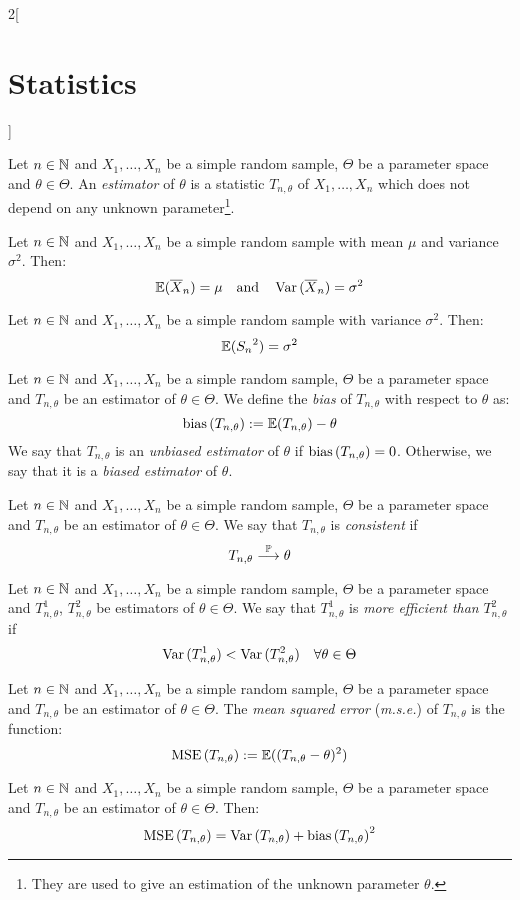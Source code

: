 \documentclass[../../../main.tex]{subfiles}
\begin{document}
\begin{multicols}{2}[\section{Statistics}]
\begin{definition}
  \end{definition}
  \begin{definition}
    Let $n\in\mathbb{N}$ and $X_1,\ldots,X_n$ be a simple random sample, $\Theta$ be a parameter space and $\theta\in\Theta$. An \emph{estimator} of $\theta$ is a statistic $T_{n,\theta}$ of $X_1,\ldots,X_n$ which does not depend on any unknown parameter\footnote{They are used to give an estimation of the unknown parameter $\theta$.}.
  \end{definition}
  \begin{prop}
    Let $n\in\mathbb{N}$ and $X_1,\ldots,X_n$ be a simple random sample with mean $\mu$ and variance $\sigma^2$. Then: $$\mathbb{E}{(\overline{X}_n)}=\mu\quad\text{and}\quad\operatorname{Var}{(\overline{X}_n)}=\sigma^2$$
  \end{prop}
  \begin{prop}
    Let $n\in\mathbb{N}$ and $X_1,\ldots,X_n$ be a simple random sample with variance $\sigma^2$. Then: $$\mathbb{E}{({S_n}^2)}=\sigma^2$$
  \end{prop}
  \begin{definition}
    Let $n\in\mathbb{N}$ and $X_1,\ldots,X_n$ be a simple random sample, $\Theta$ be a parameter space and $T_{n,\theta}$ be an estimator of $\theta\in\Theta$. We define the \emph{bias} of $T_{n,\theta}$ with respect to $\theta$ as: $$\operatorname{bias}{(T_{n,\theta})}:=\mathbb{E}{(T_{n,\theta})}-\theta$$ We say that $T_{n,\theta}$ is an \emph{unbiased estimator} of $\theta$ if $\operatorname{bias}{(T_{n,\theta})}=0$. Otherwise, we say that it is a \emph{biased estimator} of $\theta$.
  \end{definition}
  \begin{definition}
    Let $n\in\mathbb{N}$ and $X_1,\ldots,X_n$ be a simple random sample, $\Theta$ be a parameter space and $T_{n,\theta}$ be an estimator of $\theta\in\Theta$. We say that $T_{n,\theta}$ is \emph{consistent} if $$T_{n,\theta}\overset{\mathbb{P}}{\longrightarrow}\theta$$
  \end{definition}
  \begin{definition}
    Let $n\in\mathbb{N}$ and $X_1,\ldots,X_n$ be a simple random sample, $\Theta$ be a parameter space and $T_{n,\theta}^1$, $T_{n,\theta}^2$ be estimators of $\theta\in\Theta$. We say that $T_{n,\theta}^1$ is \emph{more efficient than} $T_{n,\theta}^2$ if $$\operatorname{Var}{(T_{n,\theta}^1)}<\operatorname{Var}{(T_{n,\theta}^2)}\quad\forall\theta\in\Theta$$
  \end{definition}
  \begin{definition}
    Let $n\in\mathbb{N}$ and $X_1,\ldots,X_n$ be a simple random sample, $\Theta$ be a parameter space and $T_{n,\theta}$ be an estimator of $\theta\in\Theta$. The \emph{mean squared error} (\emph{m.s.e.}) of $T_{n,\theta}$ is the function: $$\operatorname{MSE}{(T_{n,\theta})}:=\mathbb{E}{((T_{n,\theta}-\theta)^2)}$$
  \end{definition}
  \begin{prop}
    Let $n\in\mathbb{N}$ and $X_1,\ldots,X_n$ be a simple random sample, $\Theta$ be a parameter space and $T_{n,\theta}$ be an estimator of $\theta\in\Theta$. Then: $$\operatorname{MSE}{(T_{n,\theta})}=\operatorname{Var}{(T_{n,\theta})}+{\operatorname{bias}{(T_{n,\theta})}}^2$$
  \end{prop}


\end{multicols}
\end{document}
